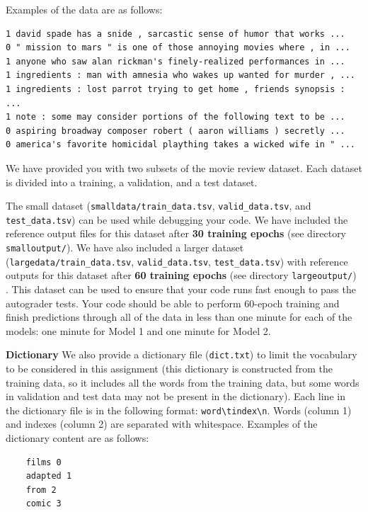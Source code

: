 \documentclass[11pt,addpoints,answers]{exam}
\begin{document}
Examples of the data are as follows:
 
\begin{lstlisting}
1 david spade has a snide , sarcastic sense of humor that works ... 
0 " mission to mars " is one of those annoying movies where , in ...
1 anyone who saw alan rickman's finely-realized performances in ...
1 ingredients : man with amnesia who wakes up wanted for murder , ...
1 ingredients : lost parrot trying to get home , friends synopsis : ... 
1 note : some may consider portions of the following text to be ...
0 aspiring broadway composer robert ( aaron williams ) secretly ...
0 america's favorite homicidal plaything takes a wicked wife in " ...
\end{lstlisting}

We have provided you with two subsets of the movie review dataset. Each dataset is divided into a training, a validation, and a test dataset.

The small dataset (\lstinline{smalldata/train_data.tsv}, \lstinline{valid_data.tsv}, and \lstinline{test_data.tsv}) can be used while debugging your code. We have included the reference output files for this dataset after \textbf{30 training epochs} (see directory \lstinline{smalloutput/}). 
%
We have also included a larger dataset \\(\lstinline{largedata/train_data.tsv}, \lstinline{valid_data.tsv}, \lstinline{test_data.tsv}) with reference outputs for this dataset after \textbf{60 training epochs}  (see directory \lstinline{largeoutput/}) . This dataset can be used to ensure that your code runs fast enough to pass the autograder tests. Your code should be able to perform 60-epoch training and finish  predictions through all of the data in less than one minute for each of the models: one minute for Model 1 and one minute for Model 2.

  {\bf Dictionary } We also provide a dictionary file (\lstinline{dict.txt}) to limit the vocabulary to be considered in this assignment (this dictionary is constructed from the training data, so it includes all the words from the training data, but some words in validation and test data may not be present in the dictionary). Each line in the dictionary file is in the following format: \lstinline{word\tindex\n}. Words (column 1) and indexes (column 2) are separated with whitespace. Examples of the dictionary content are as follows: 
    \begin{lstlisting}
    films 0
    adapted 1
    from 2
    comic 3
    \end{lstlisting}
 
\end{document}
